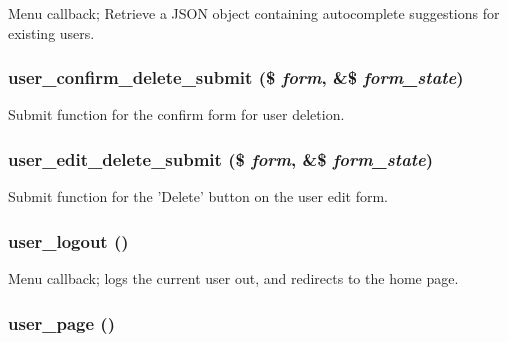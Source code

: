 Menu callback; Retrieve a JSON object containing autocomplete suggestions for existing users. \hypertarget{user_8pages_8inc_462a20e1dc458d7fd3f0a3214863d46f}{
\subsubsection[{user\_\-confirm\_\-delete\_\-submit}]{\setlength{\rightskip}{0pt plus 5cm}user\_\-confirm\_\-delete\_\-submit (\$ {\em form}, \/  \&\$ {\em form\_\-state})}}
\label{user_8pages_8inc_462a20e1dc458d7fd3f0a3214863d46f}


Submit function for the confirm form for user deletion. \hypertarget{user_8pages_8inc_13c3ecd9255448bd605fcd4ee0daa294}{
\subsubsection[{user\_\-edit\_\-delete\_\-submit}]{\setlength{\rightskip}{0pt plus 5cm}user\_\-edit\_\-delete\_\-submit (\$ {\em form}, \/  \&\$ {\em form\_\-state})}}
\label{user_8pages_8inc_13c3ecd9255448bd605fcd4ee0daa294}


Submit function for the 'Delete' button on the user edit form. \hypertarget{user_8pages_8inc_239a2e50f18165d4a8b4c8bd3917466e}{
\subsubsection[{user\_\-logout}]{\setlength{\rightskip}{0pt plus 5cm}user\_\-logout ()}}
\label{user_8pages_8inc_239a2e50f18165d4a8b4c8bd3917466e}


Menu callback; logs the current user out, and redirects to the home page. \hypertarget{user_8pages_8inc_ac56f8d931a31fe423974228cec2cf57}{
\subsubsection[{user\_\-page}]{\setlength{\rightskip}{0pt plus 5cm}user\_\-page ()}}
\label{user_8pages_8inc_ac56f8d931a31fe423974228cec2cf57}


